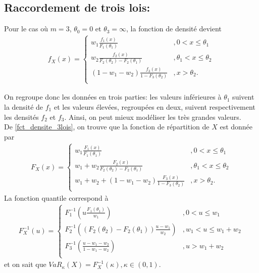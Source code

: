 	
	\subsection{Raccordement de trois lois:}
	Pour le cas où $m=3$, $\theta_0=0$ et $\theta_3=\infty$, la fonction de densité devient
	\begin{align}\label{fct_densite_3lois}
		f_X(x) = \left\{
		\begin{array}{ll}
			w_1 \frac{f_1(x)}{F_1(\theta_1)} & ,0 < x \leq \theta_1 \\
			w_2 \frac{f_2(x)}{F_2(\theta_2)-F_2(\theta_1)} & ,\theta_1 < x \leq \theta_2 \\
			(1-w_1-w_2) \frac{f_3(x)}{1-F_3(\theta_2)} & ,x > \theta_2.  \\
		\end{array}
		\right.
	\end{align}
	
	On regroupe donc les données en trois parties: les valeurs inférieures à $\theta_1$ suivent la densité de $f_1$ et les valeurs élevées, regroupées en deux, suivent respectivement les densités $f_2$ et $f_3$. Ainsi, on peut mieux modéliser les très grandes valeurs.\\
	
	De \ref{fct_densite_3lois}, on trouve que la fonction de répartition de $X$ est donnée par
	\begin{align}\label{fct_repart_3lois}
		F_X(x) = \left\{
		\begin{array}{ll}
			w_1 \frac{F_1(x)}{F_1(\theta_1)} & ,0 < x \leq \theta_1 \\
			w_1 + w_2 \frac{F_2(x)}{F_2(\theta_2)-F_2(\theta_1)} & ,\theta_1 < x \leq \theta_2 \\
			w_1 + w_2 + (1-w_1-w_2) \frac{F_3(x)}{1-F_3(\theta_2)} & , x > \theta_2.  \\
		\end{array}
		\right.
	\end{align}
	La fonction quantile correspond à
	\begin{align}\label{fct_quant_3lois}
		F_X^{-1}(u) = \left\{
		\begin{array}{ll}
			F_1^{-1} \left( u \frac{F_1(\theta_1)}{w_1} \right) & ,0 < u \leq w_1 \\
			F_2^{-1} \left((F_2(\theta_2)-F_2(\theta_1))  \frac{u - w_1}{w_2} \right) & ,w_1 < u \leq w_1+w_2 \\
			F_3^{-1} \left( \frac{u - w_1-w_2}{1-w_1-w_2} \right) & , u > w_1+w_2  \\
		\end{array}
		\right.
	\end{align}
	et on sait que $VaR_\kappa(X) = F_X^{-1}(\kappa), \kappa \in (0,1).$\\
	
